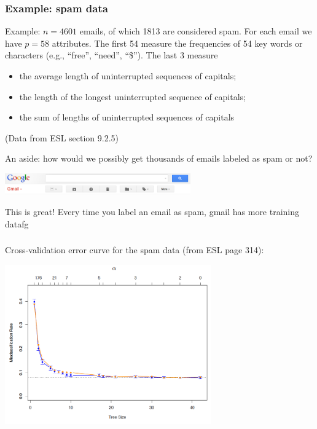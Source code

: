 \documentclass[mathserif]{beamer}
\begin{document}
\begin{frame}
\frametitle{Example: spam data}
\smallskip
Example: $n=4601$ emails, of which 1813 are considered spam. For each email
we have $p=58$ attributes. The first 54 measure the frequencies of 54 key words
or characters (e.g., ``free'', ``need'', ``\$''). The last 3 measure 
\begin{itemize}
\item the average length of uninterrupted sequences of capitals;
\item the length of the longest uninterrupted sequence of capitals;
\item the sum of lengths of uninterrupted sequences of capitals
\end{itemize}
(Data from ESL section 9.2.5)

\bigskip
An aside: how would we possibly get thousands of emails labeled as spam or not?
\begin{center}
\includegraphics[width=0.6\textwidth]{gmail.png}
\end{center}
This is great! Every time you label an email as spam, gmail has more training datafg
\end{frame}

\begin{frame}
\frametitle{}
\bigskip
Cross-validation error curve for the spam data (from ESL page 314):

\vspace{-5pt}
\begin{center}
\includegraphics[width=3.5in]{spamcv.png}
\end{center}
\end{frame}
\end{document}
